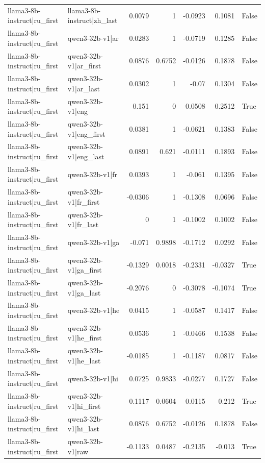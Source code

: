 \begin{table}
\begin{tabular}{l l r r r r l}
llama3-8b-instruct|ru_first & llama3-8b-instruct|zh_last & 0.0079 & 1 & -0.0923 & 0.1081 & False \\
llama3-8b-instruct|ru_first & qwen3-32b-v1|ar & 0.0283 & 1 & -0.0719 & 0.1285 & False \\
llama3-8b-instruct|ru_first & qwen3-32b-v1|ar_first & 0.0876 & 0.6752 & -0.0126 & 0.1878 & False \\
llama3-8b-instruct|ru_first & qwen3-32b-v1|ar_last & 0.0302 & 1 & -0.07 & 0.1304 & False \\
llama3-8b-instruct|ru_first & qwen3-32b-v1|eng & 0.151 & 0 & 0.0508 & 0.2512 & True \\
llama3-8b-instruct|ru_first & qwen3-32b-v1|eng_first & 0.0381 & 1 & -0.0621 & 0.1383 & False \\
llama3-8b-instruct|ru_first & qwen3-32b-v1|eng_last & 0.0891 & 0.621 & -0.0111 & 0.1893 & False \\
llama3-8b-instruct|ru_first & qwen3-32b-v1|fr & 0.0393 & 1 & -0.061 & 0.1395 & False \\
llama3-8b-instruct|ru_first & qwen3-32b-v1|fr_first & -0.0306 & 1 & -0.1308 & 0.0696 & False \\
llama3-8b-instruct|ru_first & qwen3-32b-v1|fr_last & 0 & 1 & -0.1002 & 0.1002 & False \\
llama3-8b-instruct|ru_first & qwen3-32b-v1|ga & -0.071 & 0.9898 & -0.1712 & 0.0292 & False \\
llama3-8b-instruct|ru_first & qwen3-32b-v1|ga_first & -0.1329 & 0.0018 & -0.2331 & -0.0327 & True \\
llama3-8b-instruct|ru_first & qwen3-32b-v1|ga_last & -0.2076 & 0 & -0.3078 & -0.1074 & True \\
llama3-8b-instruct|ru_first & qwen3-32b-v1|he & 0.0415 & 1 & -0.0587 & 0.1417 & False \\
llama3-8b-instruct|ru_first & qwen3-32b-v1|he_first & 0.0536 & 1 & -0.0466 & 0.1538 & False \\
llama3-8b-instruct|ru_first & qwen3-32b-v1|he_last & -0.0185 & 1 & -0.1187 & 0.0817 & False \\
llama3-8b-instruct|ru_first & qwen3-32b-v1|hi & 0.0725 & 0.9833 & -0.0277 & 0.1727 & False \\
llama3-8b-instruct|ru_first & qwen3-32b-v1|hi_first & 0.1117 & 0.0604 & 0.0115 & 0.212 & True \\
llama3-8b-instruct|ru_first & qwen3-32b-v1|hi_last & 0.0876 & 0.6752 & -0.0126 & 0.1878 & False \\
llama3-8b-instruct|ru_first & qwen3-32b-v1|raw & -0.1133 & 0.0487 & -0.2135 & -0.013 & True \\

\end{tabular}
\end{table}

